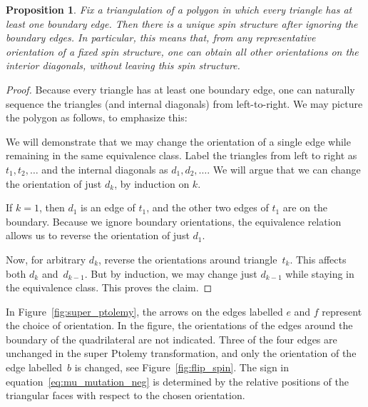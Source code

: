 \documentclass[11pt]{article}
\numberwithin{equation}{section}
\numberwithin{equation}{section}
\newtheorem{Proposition}[Theorem]{Proposition}
 {\theoremstyle{Definition}
\newtheorem{Definition}[Theorem]{Definition}
\newtheorem{Example}[Theorem]{Example}
\newtheorem{Remark}[Theorem]{Remark}
\newtheorem{Question}[Theorem]{Question} }
\begin{document}
\begin {Proposition} \label{prop:equiv_rel}
 Fix a triangulation of a polygon in which every triangle has at least one boundary edge. Then there is a unique spin structure after ignoring the boundary edges. In particular, this means that, from any representative orientation of a fixed spin structure, one can obtain all other orientations on the interior diagonals, without leaving this spin structure.
\end {Proposition}
\begin {proof}
 Because every triangle has at least one boundary edge, one can naturally sequence the triangles (and internal diagonals) from left-to-right.
 We may picture the polygon as follows, to emphasize this:
 \begin{center}
 \end{center}
 We will demonstrate that we may change the orientation of a single edge while remaining in the same equivalence class. Label
 the triangles from left to right as $t_1,t_2,\dots$ and the internal diagonals as $d_1,d_2,\dots$. We will argue that we can change
 the orientation of just $d_k$, by induction on $k$.

 If $k=1$, then $d_1$ is an edge of $t_1$, and the other two edges of $t_1$ are on the boundary. Because we ignore boundary orientations,
 the equivalence relation allows us to reverse the orientation of just $d_1$.

 Now, for arbitrary $d_k$, reverse the orientations around triangle~$t_k$. This affects both $d_k$ and~$d_{k-1}$. But by induction, we may
 change just $d_{k-1}$ while staying in the equivalence class. This proves the claim.
\end {proof}

In Figure~\ref{fig:super_ptolemy}, the arrows on the edges labelled $e$ and $f$ represent the choice of orientation. In the figure,
the orientations of the edges around the boundary of the quadrilateral are not indicated. Three of the four edges are unchanged
in the super Ptolemy transformation, and only the orientation of the edge labelled~$b$ is changed, see Figure~\ref{fig:flip_spin}. The sign in equation~\eqref{eq:mu_mutation_neg} is determined by the relative positions of the triangular faces with respect to the chosen orientation.
\end{document}
